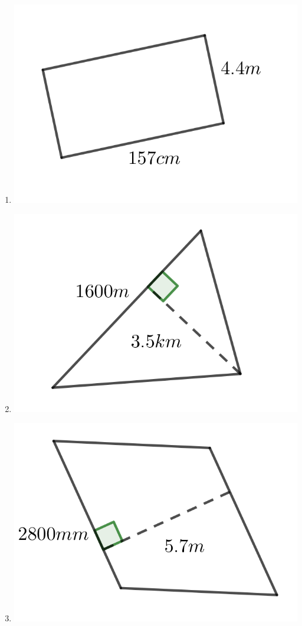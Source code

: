\begin{multicols}{2}
\begin{enumerate}
	\item \includegraphics{./Images/Measurement/AreaQu13.png}
	\item \includegraphics{./Images/Measurement/AreaQu14.png}
	\item \includegraphics{./Images/Measurement/AreaQu15.png}

\end{enumerate}
\end{multicols}

